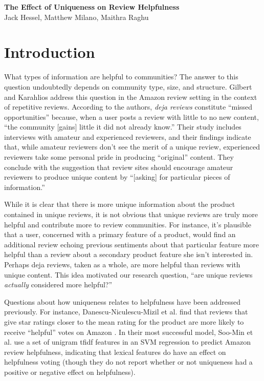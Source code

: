 \documentclass[10pt]{article}
\date{}
\begin{document}
\begin{flushleft}
{\Large
\textbf{The Effect of Uniqueness on Review Helpfulness}
}
\\
Jack Hessel, 
Matthew Milano, 
Maithra Raghu
\end{flushleft}

\section*{Introduction}
What types of information are helpful to communities? The answer to this question undoubtedly depends on community type, size, and structure. Gilbert and Karahlios address this question in the Amazon review setting \cite{gilbert2010understanding} in the context of repetitive reviews. According to the authors, \emph{deja reviews} constitute ``missed opportunities'' because, when a user posts a review with little to no new content, ``the community [gains] little it did not already know.'' Their study includes interviews with amateur and experienced reviewers, and their findings indicate that, while amateur reviewers don't see the merit of a unique review, experienced reviewers take some personal pride in producing ``original'' content. They conclude with the suggestion that review sites should encourage amateur reviewers to produce unique content by ``[asking] for particular pieces of information.''

While it is clear that there is more unique information about the product contained in unique reviews, it is not obvious that unique reviews are truly more helpful and contribute more to review communities. For instance, it's plausible that a user, concerned with a primary feature of a product, would find an additional review echoing previous sentiments about that particular feature more helpful than a review about a secondary product feature she isn't interested in. Perhaps deja reviews, taken as a whole, are more helpful than reviews with unique content. This idea motivated our research question, ``are unique reviews \emph{actually} considered more helpful?''

Questions about how uniqueness relates to helpfulness have been addressed previously. For instance, Danescu-Niculescu-Mizil et al. find that reviews that give star ratings closer to the mean rating for the product are more likely to receive ``helpful'' votes on Amazon \cite{danescu2009opinions}. In their most successful model, Soo-Min et al. \cite{kim2006automatically} use a set of unigram tfidf features in an SVM regression to predict Amazon review helpfulness, indicating that lexical features do have an effect on helpfulness voting (though they do not report whether or not uniqueness had a positive or negative effect on helpfulness).
\end{document}
